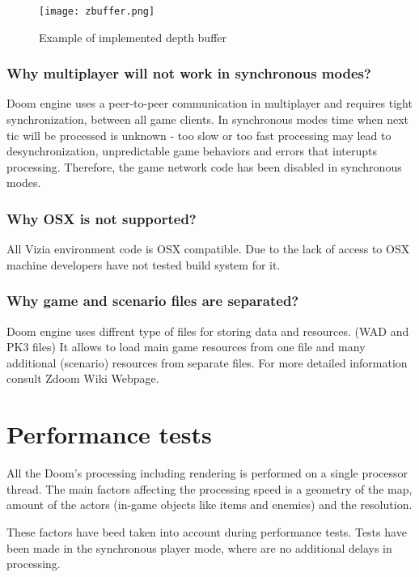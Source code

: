 \begin{figure}
\centering
\texttt{[image: zbuffer.png]}
\caption{Example of implemented depth buffer}
\label{fig:zbuffer}
\end{figure}

\subsubsection{Why multiplayer will not work in synchronous modes?}

Doom engine uses a peer-to-peer communication in multiplayer and requires tight synchronization, between all game clients.
In synchronous modes time when next tic will be processed is unknown - too slow or too fast processing may lead to desynchronization, unpredictable game behaviors and errors that interupts processing. Therefore, the game network code has been disabled in synchronous modes.

\subsubsection{Why OSX is not supported?}

All Vizia environment code is OSX compatible. Due to the lack of access to OSX machine developers have not tested build system for it.

\subsubsection{Why game and scenario files are separated?}

Doom engine uses diffrent type of files for storing data and resources. (WAD and PK3 files) It allows to load main game resources from one file and many additional (scenario) resources from separate files. For more detailed information consult Zdoom Wiki Webpage\cite{zdoom-wiki}.

\section{Performance tests}\label{sec:performance}

All the Doom's processing including rendering is performed on a single processor thread. The main factors affecting the processing speed is a geometry of the map, amount of the actors (in-game objects like items and enemies) and the resolution.

These factors have beed taken into account during performance tests. Tests have been made in the synchronous player mode, where are no additional delays in processing.

